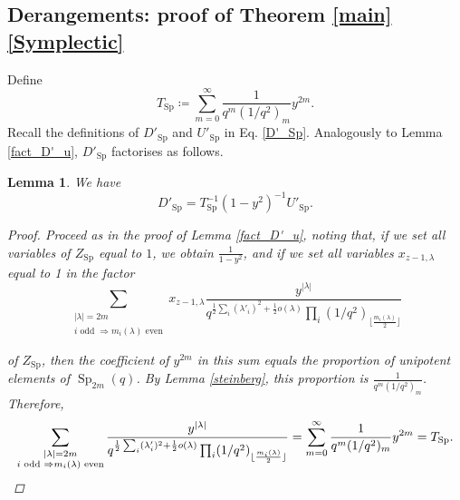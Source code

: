 \documentclass[a4paper, 12pt, oneside]{amsart}
\newtheorem{lemma}[prop]{Lemma}
\theoremstyle{definition}
\DeclareMathOperator{\Sp}{Sp}
\begin{document}
\subsection{Derangements: proof of Theorem \ref{main}\eqref{Symplectic}}
Define
\begin{equation}
\label{T_Sp}
T_{\Sp}\coloneqq\sum_{m=0}^{\infty}\frac{1}{q^m(1/q^2)_m}y^{2m}.
\end{equation}
Recall the definitions of $D'_{\Sp}$ and $U'_{\Sp}$  in Eq. \eqref{D'_Sp}.
Analogously to Lemma \ref{fact_D'_u}, $D'_{\Sp}$ factorises as follows.
\begin{lemma}
\label{fact_D'_sp}
We have
$$D'_{\Sp}=T^{-1}_{\Sp}(1-y^2)^{-1}U'_{\Sp}.$$
\begin{proof}
Proceed as in the proof of Lemma \ref{fact_D'_u}, noting that, if we set all variables of $Z_{\Sp}$ equal to $1$, we obtain $\frac{1}{1-y^2}$, and if we set all variables $x_{z-1,\lambda}$ equal to 1 in the factor 
$$\sum_{\substack{|\lambda|=2m\\ i \text{ odd }\Rightarrow m_i(\lambda) \text{ even}}}x_{z-1,\lambda}\frac{y^{|\lambda|}}{q^{\frac{1}{2}\sum_i(\lambda'_i)^2+\frac{1}{2}o(\lambda)}\prod_i(1/q^2)_{\lfloor\frac{m_i(\lambda)}{2}\rfloor}}$$

of $Z_{\Sp}$, then the coefficient of $y^{2m}$ in this sum equals the proportion of unipotent elements of $\Sp_{2m}(q)$. By Lemma \ref{steinberg}, this proportion is $\frac{1}{q^m(1/q^2)_m}$.
Therefore,
\begin{equation*}
\sum_{\substack{|\lambda|=2m\\ i \text{ odd }\Rightarrow m_i(\lambda) \text{ even}}}\frac{y^{|\lambda|}}{q^{\frac{1}{2}\sum_i(\lambda'_i)^2+\frac{1}{2}o(\lambda)}\prod_i(1/q^2)_{\lfloor\frac{m_i(\lambda)}{2}\rfloor}}=\sum_{m=0}^{\infty}\frac{1}{q^m(1/q^2)_m}y^{2m}=T_{\Sp}.
\qedhere
\end{equation*} 
\end{proof}
\end{lemma}
\end{document}
